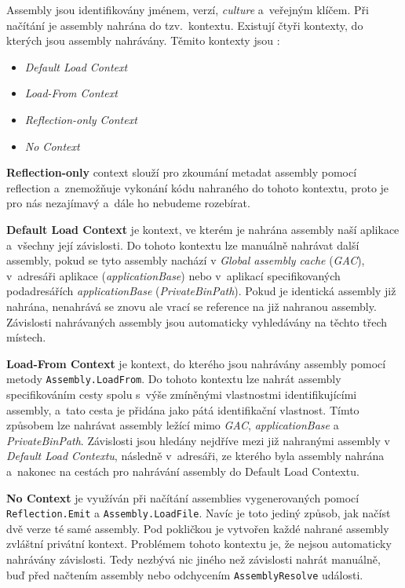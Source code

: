 Assembly jsou identifikovány jménem, verzí, \textit{culture} a~veřejným klíčem. 
Při načítání je assembly nahrána do tzv.~kontextu. Existují čtyři kontexty, do kterých jsou assembly nahrávány. Těmito kontexty jsou \citep{site:assemblyload}:
\begin{itemize}
	\item \textit{Default Load Context}
	\item \textit{Load-From Context}
	\item \textit{Reflection-only Context}
	\item \textit{No Context}
\end{itemize}

\textbf{Reflection-only} context slouží pro zkoumání metadat assembly pomocí reflection a~znemožňuje vykonání kódu nahraného do tohoto kontextu, proto je pro nás nezajímavý a~dále ho nebudeme rozebírat.

\textbf{Default Load Context} je kontext, ve kterém je nahrána assembly naší aplikace a~všechny její závislosti. Do tohoto kontextu lze manuálně nahrávat další assembly, pokud se tyto assembly nachází v \textit{Global assembly cache} (\emph{GAC}), v~adresáři aplikace (\textit{applicationBase}) nebo v~aplikací specifikovaných podadresářích \textit{applicationBase} (\textit{PrivateBinPath}). Pokud je identická assembly již nahrána, nenahrává se znovu ale vrací se reference na již nahranou assembly. Závislosti nahrávaných assembly jsou automaticky vyhledávány na těchto třech místech.

\textbf{Load-From Context} je kontext, do kterého jsou nahrávány assembly pomocí metody \texttt{Assembly.LoadFrom}. Do tohoto kontextu lze nahrát assembly specifikováním cesty spolu s~výše zmíněnými vlastnostmi identifikujícími assembly, a~tato cesta je přidána jako pátá identifikační vlastnost. Tímto způsobem lze nahrávat assembly ležící mimo \emph{GAC}, \textit{applicationBase} a \textit{PrivateBinPath}. Závislosti jsou hledány nejdříve mezi již nahranými assembly v \textit{Default Load Contextu}, následně v~adresáři, ze kterého byla assembly nahrána a~nakonec na cestách pro nahrávání assembly do Default Load Contextu.

\textbf{No Context} je využíván při načítání  assemblies vygenerovaných pomocí \texttt{Reflection.Emit} a \texttt{Assembly.LoadFile}. Navíc je toto jediný způsob, jak načíst dvě verze té samé assembly. Pod pokličkou je vytvořen každé nahrané assembly zvláštní privátní kontext. Problémem tohoto kontextu je, že nejsou automaticky nahrávány závislosti. Tedy nezbývá nic jiného než závislosti nahrát manuálně, buď před načtením assembly nebo odchycením \texttt{AssemblyResolve} události.

